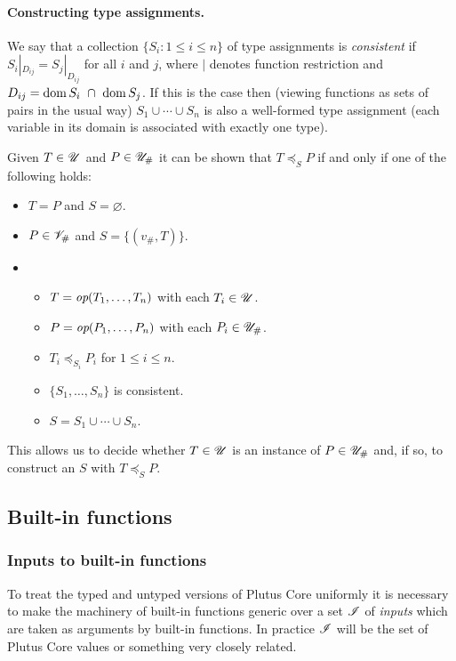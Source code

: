 \paragraph{Constructing type assignments.}
We say that a collection $\{S_i: 1 \leq i \leq n\}$ of type assignments is
\textit{consistent} if $S_i|_{D_{ij}} = S_j|_{D_{ij}}$ for all $i$ and $j$,
where $|$ denotes function restriction and $D_{ij} = \operatorname{dom} S_i \ \cap \ \operatorname{dom}
S_j$.  If this is the case then (viewing functions as sets of pairs in the usual
way) $S_1 \cup \cdots \cup S_n$ is also a well-formed type assignment (each
variable in its domain is associated with exactly one type).

\medskip
\noindent Given $T \in \mathscr{U}$ and $P \in {\mathscr{U}_{\#}}$ it can be shown that $T \preceq_S P$ if
and only if one of the following holds:
\begin{itemize}
  \item $T = P$ and $S =\varnothing$.
  \item $P \in \mathscr{V}_\#$ and $S = \{(v_\#, T)\}$.
  \item 
    \begin{itemize}
    \item $T = \textit{op}(T_1, \ldots, T_n)$ with each $T_i \in \mathscr{U}$.
    \item $P = \textit{op}(P_1, \ldots, P_n)$ with each $P_i \in {\mathscr{U}_{\#}}$.
    \item $T_i \preceq_{S_i} P_i$ for $1 \leq i \leq n$.
    \item $\{S_1, \ldots, S_n\}$ is consistent.
    \item $S = S_1 \cup \cdots \cup S_n$.
    \end{itemize}
\end{itemize}

\noindent This allows us to decide whether $T \in \mathscr{U}$ is an instance of $P \in
{\mathscr{U}_{\#}}$ and, if so, to construct an $S$ with $T \preceq_S P$.

  
\subsection{Built-in functions}
\label{sec:builtin-functions}

\subsubsection{Inputs to built-in functions}
\label{sec:builtin-inputs}
To treat the typed and untyped versions of Plutus Core uniformly it is necessary
to make the machinery of built-in functions generic over a set $\mathscr{I}$ of
\textit{inputs} which are taken as arguments by built-in functions.  In practice
$\mathscr{I}$ will be the set of Plutus Core values or something very closely
related.%

